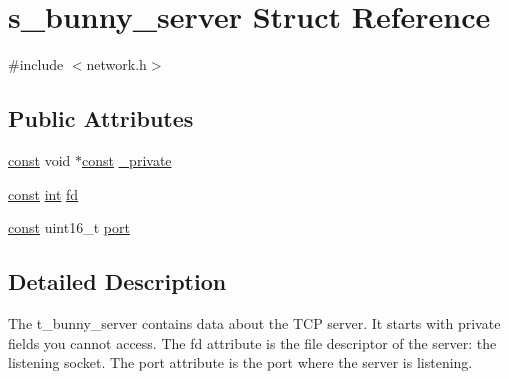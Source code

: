 \hypertarget{structs__bunny__server}{\section{s\-\_\-bunny\-\_\-server Struct Reference}
\label{structs__bunny__server}
}


{\ttfamily \#include $<$network.\-h$>$}

\subsection*{Public Attributes}
\begin{DoxyCompactItemize}
\item 
\hyperlink{term__entry_8h_a57bd63ce7f9a353488880e3de6692d5a}{const} void $\ast$\hyperlink{term__entry_8h_a57bd63ce7f9a353488880e3de6692d5a}{const} \hyperlink{structs__bunny__server_a66cb479387a6cbd7f9b2954a3c64579c}{\-\_\-private}
\item 
\hyperlink{term__entry_8h_a57bd63ce7f9a353488880e3de6692d5a}{const} \hyperlink{term__entry_8h_ad65b480f8c8270356b45a9890f6499ae}{int} \hyperlink{structs__bunny__server_a8a91cc2ee72f2ed3c1efb38bbb01fd5d}{fd}
\item 
\hyperlink{term__entry_8h_a57bd63ce7f9a353488880e3de6692d5a}{const} uint16\-\_\-t \hyperlink{structs__bunny__server_af9fb77d1cc6e9fcd78094e1ea90873d0}{port}
\end{DoxyCompactItemize}


\subsection{Detailed Description}
The t\-\_\-bunny\-\_\-server contains data about the T\-C\-P server. It starts with private fields you cannot access. The fd attribute is the file descriptor of the server\-: the listening socket. The port attribute is the port where the server is listening. 

